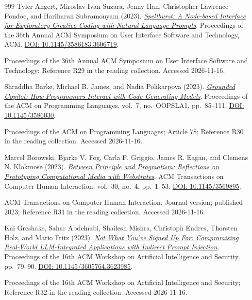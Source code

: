 \documentclass[11pt,letterpaper]{article}
\begin{document}
\begin{thebibliography}{999}
Tyler Angert, Miroslav Ivan Suzara, Jenny Han, Christopher Lawrence Pondoc, and Hariharan Subramonyam (2023).
\href{https://spellburstllm.github.io/}{\emph{Spellburst: A Node-based Interface for Exploratory Creative Coding with Natural Language Prompts}}.
Proceedings of the 36th Annual ACM Symposium on User Interface Software and Technology, ACM.
\href{https://doi.org/10.1145/3586183.3606719}{DOI: 10.1145/3586183.3606719}.
\par {\small Proceedings of the 36th Annual ACM Symposium on User Interface Software and Technology; Reference R29 in the reading collection.}
{\small Accessed 2026-11-16.}

Shraddha Barke, Michael B. James, and Nadia Polikarpova (2023).
\href{https://doi.org/10.1145/3586030}{\emph{Grounded Copilot: How Programmers Interact with Code-Generating Models}}.
Proceedings of the ACM on Programming Languages, vol.~7, no.~OOPSLA1, pp.~85--111.
\href{https://doi.org/10.1145/3586030}{DOI: 10.1145/3586030}.
\par {\small Proceedings of the ACM on Programming Languages; Article 78; Reference R30 in the reading collection.}
{\small Accessed 2026-11-16.}

Marcel Borowski, Bjarke V. Fog, Carla F. Griggio, James R. Eagan, and Clemens N. Klokmose (2023).
\href{https://doi.org/10.1145/3569895}{\emph{Between Principle and Pragmatism: Reflections on Prototyping Computational Media with Webstrates}}.
ACM Transactions on Computer-Human Interaction, vol.~30, no.~4, pp.~1--53.
\href{https://doi.org/10.1145/3569895}{DOI: 10.1145/3569895}.
\par {\small ACM Transactions on Computer-Human Interaction; Journal version; published 2023; Reference R31 in the reading collection.}
{\small Accessed 2026-11-16.}

Kai Greshake, Sahar Abdelnabi, Shailesh Mishra, Christoph Endres, Thorsten Holz, and Mario Fritz (2023).
\href{https://doi.org/10.1145/3605764.3623985}{\emph{Not What You've Signed Up For: Compromising Real-World LLM-Integrated Applications with Indirect Prompt Injection}}.
Proceedings of the 16th ACM Workshop on Artificial Intelligence and Security, pp.~79--90.
\href{https://doi.org/10.1145/3605764.3623985}{DOI: 10.1145/3605764.3623985}.
\par {\small Proceedings of the 16th ACM Workshop on Artificial Intelligence and Security; Reference R32 in the reading collection.}
{\small Accessed 2026-11-16.}


\end{thebibliography}
\end{document}

